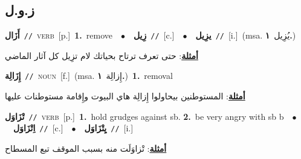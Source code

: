 \documentclass[10pt,a4paper,twoside]{article} %
\begin{document}
\begin{multicols}{2}
\vspace{-3mm}
\subsection*{\color{blue}\foreignlanguage{arabic}{ز.و.ل}\color{blue}{}} 

{\setlength\topsep{0pt}\textbf{\foreignlanguage{arabic}{أَزَال}}\ {\color{gray}\texttt{//}\color{black}}\ \textsc{verb}\ [p.]\ \textbf{1.}~remove\ \ $\bullet$\ \ \setlength\topsep{0pt}\textbf{\foreignlanguage{arabic}{زِيل}}\ {\color{gray}\texttt{//}\color{black}}\ [c.]\ \ $\bullet$\ \ \setlength\topsep{0pt}\textbf{\foreignlanguage{arabic}{يزِيل}}\ {\color{gray}\texttt{//}\color{black}}\ [i.]\ \color{gray}(msa. \foreignlanguage{arabic}{يُزِيل}~\foreignlanguage{arabic}{\textbf{١.}})\color{black}\  \begin{flushright}\color{gray}\foreignlanguage{arabic}{\textbf{\underline{\foreignlanguage{arabic}{أمثلة}}}: حتى تعرف ترتاح بحياتك لام تزِيل كل آثار الماضي}\end{flushright}\color{black}} \vspace{2mm}

{\setlength\topsep{0pt}\textbf{\foreignlanguage{arabic}{إِزَالِة}}\ {\color{gray}\texttt{//}\color{black}}\ \textsc{noun}\ [f.]\ \color{gray}(msa. \foreignlanguage{arabic}{إِزالِة}~\foreignlanguage{arabic}{\textbf{١.}})\color{black}\ \textbf{1.}~removal\  \begin{flushright}\color{gray}\foreignlanguage{arabic}{\textbf{\underline{\foreignlanguage{arabic}{أمثلة}}}: المستوطنين بيحاولوا إِزالِة هاي البيوت وإِقامة مستوطنات عليها}\end{flushright}\color{black}} \vspace{2mm}

{\setlength\topsep{0pt}\textbf{\foreignlanguage{arabic}{تْزَاوَل}}\ {\color{gray}\texttt{//}\color{black}}\ \textsc{verb}\ [p.]\ \textbf{1.}~hold grudges against sb.  \textbf{2.}~be very angry with sb b\ \ $\bullet$\ \ \setlength\topsep{0pt}\textbf{\foreignlanguage{arabic}{اِتْزَاوَل}}\ {\color{gray}\texttt{//}\color{black}}\ [c.]\ \ $\bullet$\ \ \setlength\topsep{0pt}\textbf{\foreignlanguage{arabic}{يِتْزَاوَل}}\ {\color{gray}\texttt{//}\color{black}}\ [i.]\  \begin{flushright}\color{gray}\foreignlanguage{arabic}{\textbf{\underline{\foreignlanguage{arabic}{أمثلة}}}: تْزاوَلَت منه بسبب الموقف تبع المسطاح}\end{flushright}\color{black}} \vspace{2mm}


\end{multicols}
\end{document}
